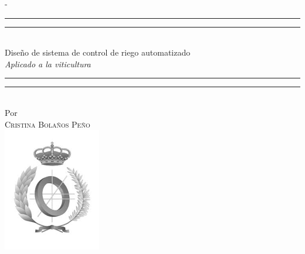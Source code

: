 %
%
% 
%
%
\begin{titlingpage}
\begin{SingleSpace}
\calccentering{\unitlength} 
\begin{adjustwidth*}{\unitlength}{-\unitlength}
\vspace*{13mm}
\begin{center}
\rule[0.5ex]{\linewidth}{2pt}\vspace*{-\baselineskip}\vspace*{3.2pt}
\rule[0.5ex]{\linewidth}{1pt}\\[\baselineskip]
{\HUGE Diseño de sistema de control de riego automatizado }\\[4mm]
{\Large \textit{Aplicado a la viticultura}}\\
\rule[0.5ex]{\linewidth}{1pt}\vspace*{-\baselineskip}\vspace{3.2pt}
\rule[0.5ex]{\linewidth}{2pt}\\
\vspace{6.5mm}
{\large Por}\\
\vspace{6.5mm}
{\large\textsc{Cristina Bolaños Peño}}\\
\vspace{11mm}
\includegraphics[scale=1]{logos/departmentIcon.png}\\

\end{center}
\end{adjustwidth*}
\end{SingleSpace}
\end{titlingpage}

